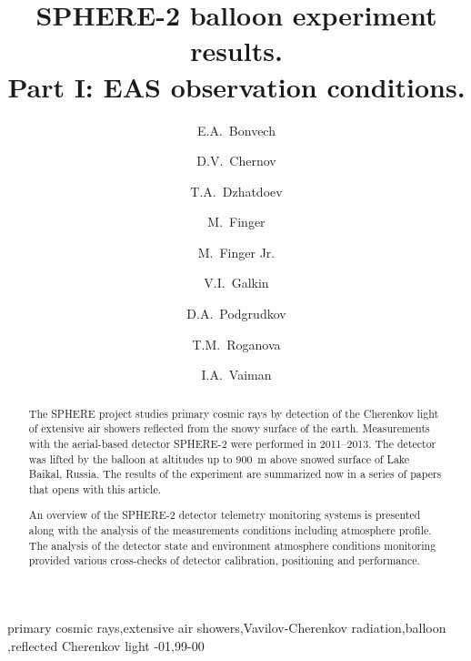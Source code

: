 \documentclass[preprint,5p,times]{elsarticle}
\begin{document}

\begin{frontmatter}
\title{SPHERE-2 balloon experiment results.\\ Part I: EAS observation conditions.}

\author[address1]{E.A.~Bonvech}
\author[address1]{D.V.~Chernov}
\author[address1]{T.A.~Dzhatdoev}
\author[address2,address3]{M.~Finger}
\author[address2,address3]{M.~Finger Jr.}
\author[address4]{V.I.~Galkin}
\author[address4,address1]{D.A.~Podgrudkov}
\author[address1]{T.M.~Roganova}
\author[address4,address1]{I.A.~Vaiman}
\address[address1]{M.V. Lomonosov Moscow State University, Skobeltsyn Institute of Nuclear Physics (SINP MSU), Moscow, Russia}
\address[address2]{Charles University, Faculty of Mathematics and Physics, Prague, Czech Republic}
\address[address3]{Joint Institute for Nuclear Research, Dubna, Russian Federation}
\address[address4]{M.V. Lomonosov Moscow State University, Faculty of Physics, Moscow, Russia}

\begin{abstract}
The SPHERE project studies primary cosmic rays by detection of the Cherenkov light of extensive air showers reflected from the snowy surface of the earth. Measurements with the aerial-based detector SPHERE-2 were performed in 2011--2013. The detector was lifted by the balloon at altitudes up to 900~m above snowed surface of Lake Baikal, Russia. The results of the experiment are summarized now in a series of papers that opens with this article.

An overview of the SPHERE-2 detector telemetry monitoring systems is presented along with the analysis of the measurements conditions including atmosphere profile. The analysis of the detector state and environment atmosphere conditions monitoring provided various cross-checks of detector calibration, positioning and performance.
\end{abstract}

\begin{keyword}
primary cosmic rays\sep extensive air showers\sep Vavilov-Cherenkov radiation\sep balloon \sep reflected Cherenkov light
-01\sep  99-00
\end{keyword}
\end{frontmatter}
\end{document}
